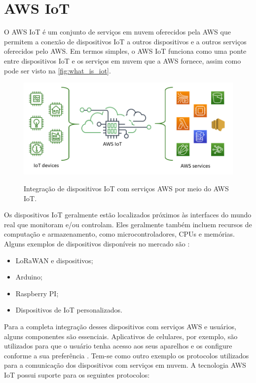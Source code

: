 \section{AWS IoT}\label{section:aws_iot}

O AWS IoT é um conjunto de serviços em nuvem oferecidos pela AWS que permitem a conexão de dispositivos IoT a outros dispositivos e a outros serviços oferecidos pelo AWS. Em termos simples, o AWS IoT funciona como uma ponte entre dispositivos IoT e os serviços em nuvem que a AWS fornece, assim como pode ser visto na \autoref{fig:what_is_iot}.

\begin{figure}[htbp]
    \centering
    \caption{Integração de dispositivos IoT com serviços AWS por meio do AWS IoT.}
    \includegraphics[scale=0.5]{Imagens/what-is-aws-iot.png}
    \label{fig:what_is_iot}
\end{figure}

Os dispositivos IoT geralmente estão localizados próximos às interfaces do mundo real que monitoram e/ou controlam. Eles geralmente também incluem recursos de computação e armazenamento, como microcontroladores, CPUs e memórias. Alguns exemplos de dispositivos disponíveis no mercado são \cite{ref:019}:

\begin{itemize}
    \item LoRaWAN e dispositivos;
    \item Arduino;
    \item Raspberry PI;
    \item Dispositivos de IoT personalizados.
\end{itemize}

Para a completa integração desses dispositivos com serviços AWS e usuários, alguns componentes são essenciais. Aplicativos de celulares, por exemplo, são utilizados para que o usuário tenha acesso aos seus aparelhos e os configure conforme a sua preferência \cite{ref:019}. Tem-se como outro exemplo os protocolos utilizados para a comunicação dos dispositivos com serviços em nuvem. A tecnologia AWS IoT possui suporte para os seguintes protocolos:

